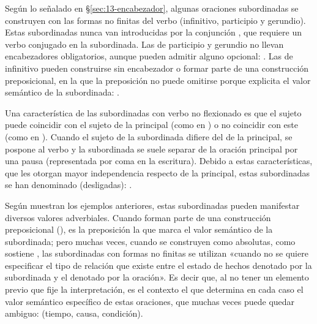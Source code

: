\begin{recuadro}
Según lo señalado en §\ref{sec:13-encabezador}, algunas oraciones subordinadas se
construyen con las formas no finitas del verbo (infinitivo, participio y
gerundio). Estas subordinadas nunca van introducidas por la conjunción
, que requiere un verbo conjugado en la subordinada. Las de participio
y gerundio no llevan encabezadores obligatorios, aunque pueden admitir alguno
opcional: . Las de infinitivo pueden construirse sin encabezador o
formar parte de una construcción preposicional, en la que la preposición no
puede omitirse porque explicita el valor semántico de la subordinada:
.

Una característica de las subordinadas con verbo no flexionado es que el sujeto
puede coincidir con el sujeto de la principal (como en ) o no coincidir con este (como en ). Cuando el sujeto de la subordinada difiere del de la
principal, se pospone al verbo y la subordinada se suele separar de la oración
principal por una pausa (representada por coma en la escritura). Debido a estas
características, que les otorgan mayor independencia respecto de la principal,
estas subordinadas se han denominado  (desligadas):
.

Según muestran los ejemplos anteriores, estas subordinadas pueden manifestar
diversos valores adverbiales. Cuando forman parte de una construcción
preposicional (), es la preposición la que marca el valor semántico de la subordinada;
pero muchas veces, cuando se construyen como absolutas, como sostiene
\textcite[672]{morenocabrera1991}, las subordinadas con formas no finitas se
utilizan «cuando no se quiere especificar el tipo de relación que existe entre el
estado de hechos denotado por la subordinada y el denotado por la oración». Es
decir que, al no tener un elemento previo que fije la interpretación, es el
contexto el que determina en cada caso el valor semántico específico de estas
oraciones, que muchas veces puede quedar ambiguo:  (tiempo, causa, condición).
\end{recuadro}

